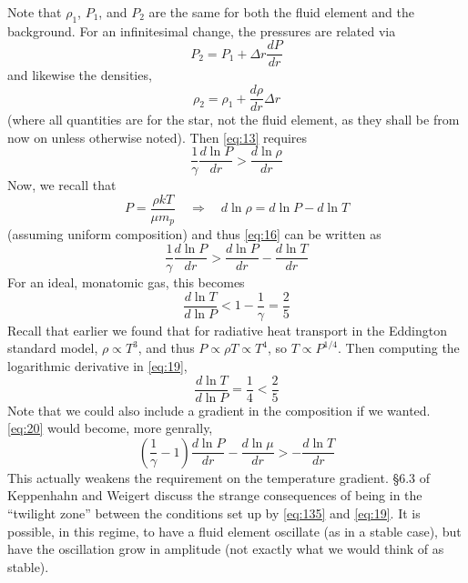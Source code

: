\documentclass[10pt]{article}
\numberwithin{equation}{section}
\begin{document}
Note that $\rho_1$, $P_1$, and $P_2$ are the same for both the fluid
element and the background. For an infinitesimal change, the pressures
are related via
\begin{equation}
  \label{eq:14}
  P_2=P_1+\Delta r\frac{dP}{dr}
\end{equation}
and likewise the densities, 
\begin{equation}
  \label{eq:15}
  \rho_2=\rho_1+\frac{d\rho}{dr}\Delta r
\end{equation}
(where all quantities are for the star, not the fluid element, as they
shall be from now on unless otherwise noted). Then \eqref{eq:13} requires
\begin{equation}
  \label{eq:16}
  \frac{1}{\gamma}\frac{d\ln P}{dr}>\frac{d\ln\rho}{dr}
\end{equation}
Now, we recall that
\begin{equation}
  \label{eq:17}
  P=\frac{\rho kT}{\mu m_p} \quad\Rightarrow \quad d\ln\rho=d\ln
  P-d\ln T
\end{equation}
(assuming uniform composition) and thus \eqref{eq:16} can be written as
\begin{equation}
  \label{eq:18}
  \frac{1}{\gamma}\frac{d\ln P}{dr}>\frac{d\ln P}{dr}-\frac{d\ln T}{dr}
\end{equation}
For an ideal, monatomic gas, this becomes
\begin{equation}
  \label{eq:19}
  \frac{d\ln T}{d\ln P}<1-\frac{1}{\gamma}=\frac{2}{5}
\end{equation}
Recall that earlier we found that for radiative heat transport in the
Eddington standard model,
$\rho\propto T^3$, and thus $P\propto \rho T\propto T^4$, so
$T\propto P^{1/4}$. Then computing the logarithmic derivative in
\eqref{eq:19}, 
\begin{equation}
  \label{eq:20}
  \frac{d\ln T}{d\ln P}=\frac{1}{4}<\frac{2}{5}
\end{equation}
Note that we could also include a gradient in the composition if we
wanted. \eqref{eq:20} would become, more genrally,
\begin{equation}
  \label{eq:135}
  \boxed{\left(\frac{1}{\gamma}-1\right)\frac{d\ln
    P}{dr}-\frac{d\ln\mu}{dr}>-\frac{d\ln T}{dr}}
\end{equation}
This actually weakens the requirement on the temperature
gradient. \S6.3 of Keppenhahn and Weigert discuss the strange
consequences of being in the ``twilight zone'' between the conditions
set up by \eqref{eq:135} and \eqref{eq:19}. It is possible, in this
regime, to have a fluid element oscillate (as in a stable case), but
have the oscillation grow in amplitude (not exactly what we would
think of as stable).\\
\end{document}
